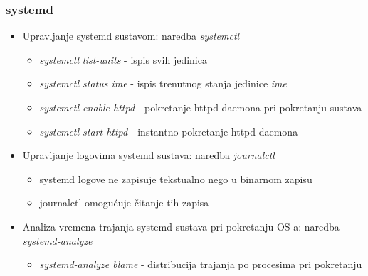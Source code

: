 \documentclass[t]{beamer}
\begin{document}
\begin{frame}
	\frametitle{systemd}
	\begin{itemize}
		\item Upravljanje systemd sustavom: naredba \textit{systemctl}
			\begin{itemize}
				\item \textit{systemctl list-units} - ispis svih jedinica
				\item \textit{systemctl status ime} - ispis trenutnog stanja jedinice \textit{ime}
				\item \textit{systemctl enable httpd} - pokretanje httpd daemona pri pokretanju sustava
				\item \textit{systemctl start httpd} - instantno pokretanje httpd daemona
			\end{itemize}
		\item Upravljanje logovima systemd sustava: naredba \textit{journalctl}
			\begin{itemize}
				\item systemd logove ne zapisuje tekstualno nego u binarnom zapisu
				\item journalctl omogućuje čitanje tih zapisa
			\end{itemize}
		\item Analiza vremena trajanja systemd sustava pri pokretanju OS-a: naredba \textit{systemd-analyze}
			\begin{itemize}
				\item \textit{systemd-analyze blame} - distribucija trajanja po procesima pri pokretanju
			\end{itemize}
		
	\end{itemize}
\end{frame}
\end{document}
